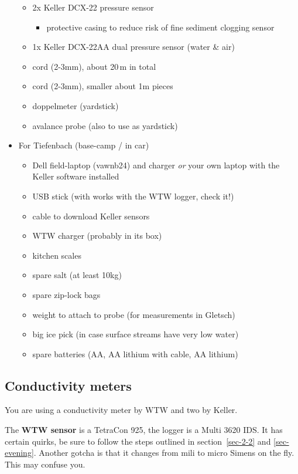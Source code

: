 \documentclass[DIV=15,halfparskip,11pt,headinclude]{scrartcl}
\begin{document}
\begin{itemize}
\begin{itemize}
  \item 2x Keller DCX-22 pressure sensor
  \begin{itemize}
    \item protective casing to
      reduce risk of fine sediment clogging sensor
    \end{itemize}
  \item 1x Keller DCX-22AA dual pressure sensor (water \& air)
  \item cord (2-3mm), about 20\,m in total
  \item cord (2-3mm), smaller about 1m pieces
  \item doppelmeter (yardstick)
  \item avalance probe (also to use as yardstick)
  \end{itemize}
\item For Tiefenbach (base-camp / in car)
  \begin{itemize}
  \item Dell field-laptop (vawnb24) and charger \emph{or} your own laptop with the Keller software installed
  \item USB stick (with works with the WTW logger, check it!)
  \item cable to download Keller sensors
  \item WTW charger (probably in its box)
  \item kitchen scales
  \item spare salt (at least 10kg)
  \item spare zip-lock bags
  \item weight to attach to probe (for measurements in Gletsch)
  \item big ice pick (in case surface streams have very low water)
  \item spare batteries (AA, AA lithium with cable, AA lithium)
  \end{itemize}
\end{itemize}


\subsection{Conductivity meters}
\label{s:cond-meters}

You are using a conductivity meter by WTW and two by Keller.

The \textbf{WTW sensor} is a TetraCon 925, the logger is a Multi 3620 IDS.  It
has certain quirks, be sure to follow the steps outlined in
section~\ref{sec-2-2} and \ref{sec-evening}.  Another gotcha is that
it changes from mili to micro Simens on the fly.  This may confuse
you.
\end{document}
